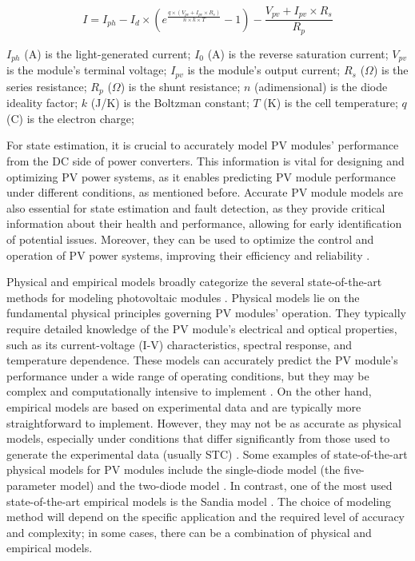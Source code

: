 \begin{equation} \label{eq:iv}
    I = I_{ph} - I_d \times (e^{\frac{q \times (V_{pv} + I_{pv} \times R_{s})}{n \times k \times T}} - 1) - \frac{V_{pv} + I_{pv} \times R_s}{R_p}
\end{equation}

$I_{ph}$ (A) is the light-generated current;
$I_{0}$ (A) is the reverse saturation current;
$V_{pv}$ is the module's terminal voltage;
$I_{pv}$ is the module's output current;
$R_{s}$ ($\Omega$) is the series resistance;
$R_{p}$ ($\Omega$) is the shunt resistance;
$n$ (adimensional) is the diode ideality factor;
$k$ (J/K) is the Boltzman constant;
$T$ (K) is the cell temperature;
$q$ (C) is the electron charge;

For state estimation, it is crucial to accurately model PV modules' performance from the DC side of power converters. This information is vital for designing and optimizing PV power systems, as it enables predicting PV module performance under different conditions, as mentioned before. Accurate PV module models are also essential for state estimation and fault detection, as they provide critical information about their health and performance, allowing for early identification of potential issues. Moreover, they can be used to optimize the control and operation of PV power systems, improving their efficiency and reliability \cite{Braun2011}.

Physical and empirical models broadly categorize the several state-of-the-art methods for modeling photovoltaic modules \cite{Braun2011}. Physical models lie on the fundamental physical principles governing PV modules' operation. They typically require detailed knowledge of the PV module's electrical and optical properties, such as its current-voltage (I-V) characteristics, spectral response, and temperature dependence. These models can accurately predict the PV module's performance under a wide range of operating conditions, but they may be complex and computationally intensive to implement \cite{Kumar2019}. On the other hand, empirical models are based on experimental data and are typically more straightforward to implement. However, they may not be as accurate as physical models, especially under conditions that differ significantly from those used to generate the experimental data (usually STC) \cite{Braun2011}. Some examples of state-of-the-art physical models for PV modules include the single-diode model (the five-parameter model) and the two-diode model \cite{Godina2017}. In contrast, one of the most used state-of-the-art empirical models is the Sandia model \cite{Braun2011}. The choice of modeling method will depend on the specific application and the required level of accuracy and complexity; in some cases, there can be a combination of physical and empirical models.

